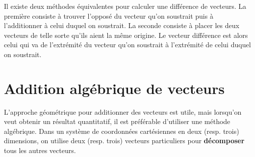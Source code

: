 \begin{marginfigure}
\end{marginfigure}

Il existe deux méthodes équivalentes pour calculer une différence de vecteurs.
La première consiste à trouver l'opposé du vecteur qu'on soustrait puis à
l'additionner à celui duquel on soustrait.  La seconde consiste à placer les
deux vecteurs de telle sorte qu'ils aient la même origine.  Le vecteur
différence est alors celui qui va de l'extrémité du vecteur qu'on soustrait à
l'extrémité de celui duquel on soustrait.


\section{Addition algébrique de vecteurs}

L'approche géométrique pour additionner des vecteurs est utile, mais lorsqu'on
veut obtenir un résultat quantitatif, il est préférable d'utiliser une méthode
algébrique.  Dans un système de coordonnées cartésiennes en deux (resp. trois)
dimensions, on utilise deux (resp. trois) vecteurs particuliers pour
\textbf{décomposer} tous les autres vecteurs.

